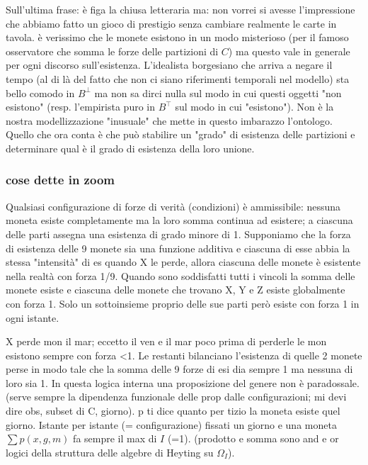\documentclass[a4paper, 11pt]{article}
\begin{document}
Sull'ultima frase: è figa la chiusa letteraria ma: non vorrei si avesse l'impressione che abbiamo fatto un gioco di prestigio senza cambiare realmente le carte in tavola. è verissimo che le monete esistono in un modo misterioso (per il famoso osservatore che somma le forze delle partizioni di $C$) ma questo vale in generale per ogni discorso sull'esistenza. L'idealista borgesiano che arriva a negare il tempo (al di là del fatto che non ci siano riferimenti temporali nel modello) sta bello comodo in $B^\bot$ ma non sa dirci nulla sul modo in cui questi oggetti "non esistono" (resp. l'empirista puro in $B^\top$ sul modo in cui "esistono"). Non è la nostra modellizzazione "inusuale" che mette in questo imbarazzo l'ontologo. Quello che ora conta è che può stabilire un "grado" di esistenza delle partizioni e determinare qual è il grado di esistenza della loro unione. 

\subsubsection{cose dette in zoom}

Qualsiasi configurazione di forze di verità (condizioni) è ammissibile: nessuna moneta esiste completamente ma la loro somma continua ad esistere; a ciascuna delle parti assegna una esistenza di grado minore di 1. Supponiamo che la forza di esistenza delle 9 monete sia una funzione additiva e ciascuna di esse abbia la stessa "intensità" di es quando X le perde, allora ciascuna delle monete è esistente nella realtà con forza 1/9. Quando sono soddisfatti tutti i vincoli la somma delle monete esiste e ciascuna delle monete che trovano X, Y e Z esiste globalmente con forza 1. Solo un sottoinsieme proprio delle sue parti però esiste con forza 1 in ogni istante. 

X perde mon il mar; eccetto il ven e il mar poco prima di perderle le mon esistono sempre con forza <1. Le restanti bilanciano l'esistenza di quelle 2 monete perse in modo tale che la somma delle 9 forze di esi dia sempre 1 ma nessuna di loro sia 1. In questa logica interna una proposizione del genere non è paradossale. (serve sempre la dipendenza funzionale delle prop dalle configurazioni; mi devi dire obs, subset di C, giorno). p ti dice quanto per tizio la moneta esiste quel giorno. Istante per istante (= configurazione) fissati un giorno e una moneta $\sum p(x,g,m)$ fa sempre il max di $I$ (=1). (prodotto e somma sono and e or logici della struttura delle algebre di Heyting su $\Omega_I$).  
\end{document}
